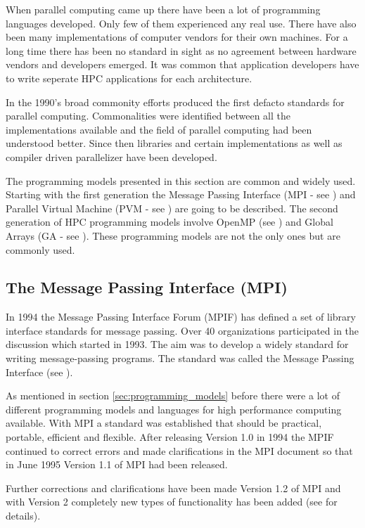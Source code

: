 When parallel computing came up there have been a lot of programming
languages developed. Only few of them experienced any real use. There
have also been many implementations of computer vendors for their own
machines. For a long time there has been no standard in sight as no
agreement between hardware vendors and developers emerged. It was
common that application developers have to write seperate HPC
applications for each architecture.

In the 1990's broad commonity efforts produced the first defacto
standards for parallel computing. Commonalities were identified
between all the implementations available and the field of parallel
computing had been understood better. Since then libraries and certain
implementations as well as compiler driven parallelizer have been
developed.

The programming models presented in this section are common and widely
used. Starting with the first generation the Message Passing Interface
(MPI - see \cite{forum94:MPI}) and Parallel Virtual Machine (PVM - see
\cite{geist94pvm})
are going to be described. The second generation of HPC programming
models involve OpenMP (see \cite{openMP05}) and Global Arrays (GA - see
\cite{nieplocha96gan}). These programming models are not the only ones
but are commonly used. 

\subsection{The Message Passing Interface (MPI)}
\label{sec:MPI}

In 1994 the Message Passing Interface Forum (MPIF) has defined a set
of library interface standards for message passing. Over 40
organizations participated in the discussion which started in
1993. The aim was to develop a widely standard for writing
message-passing programs. The standard was called the Message Passing
Interface (see \cite{forum94:MPI}).

As mentioned in section \ref{sec:programming_models} before there
were a lot of different programming models and languages for high
performance computing available. With MPI a standard was established
that should be practical, portable, efficient and flexible. After
releasing Version 1.0 in 1994 the MPIF continued to correct errors and
made clarifications in the MPI document so that in June 1995 Version
1.1 of MPI had been released.

Further corrections and clarifications have been made Version 1.2 of
MPI and with Version 2 completely new types of functionality has been
added (see \cite{forum94:MPI-2} for details).


